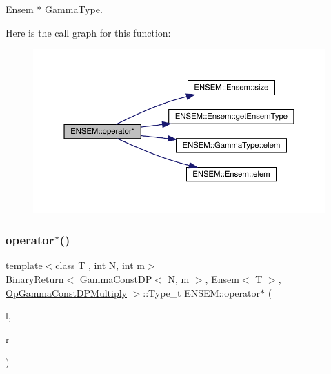 \mbox{\hyperlink{classENSEM_1_1Ensem}{Ensem}} $\ast$ \mbox{\hyperlink{classENSEM_1_1GammaType}{Gamma\+Type}}. 

Here is the call graph for this function\+:\nopagebreak
\begin{figure}[H]
\begin{center}
\leavevmode
\includegraphics[width=350pt]{d1/d9e/group__eensem_ga5a4ddba3b396c11e474246b57940a2cc_cgraph}
\end{center}
\end{figure}
\mbox{\label{group__eensem_ga60f93a7eee86e9559faa6e162cf9b9a1}} 
\subsubsection{\texorpdfstring{operator$\ast$()}{operator*()}\hspace{0.1cm}{\footnotesize\ttfamily [8/11]}}
{\footnotesize\ttfamily template$<$class T , int N, int m$>$ \\
\mbox{\hyperlink{structENSEM_1_1BinaryReturn}{Binary\+Return}}$<$ \mbox{\hyperlink{classENSEM_1_1GammaConstDP}{Gamma\+Const\+DP}}$<$ \mbox{\hyperlink{adat__devel_2lib_2hadron_2operator__name__util_8cc_a7722c8ecbb62d99aee7ce68b1752f337}{N}}, m $>$, \mbox{\hyperlink{classENSEM_1_1Ensem}{Ensem}}$<$ T $>$, \mbox{\hyperlink{structENSEM_1_1OpGammaConstDPMultiply}{Op\+Gamma\+Const\+D\+P\+Multiply}} $>$\+::Type\+\_\+t E\+N\+S\+E\+M\+::operator$\ast$ (\begin{DoxyParamCaption}\item[{const \mbox{\hyperlink{classENSEM_1_1GammaConstDP}{Gamma\+Const\+DP}}$<$ \mbox{\hyperlink{adat__devel_2lib_2hadron_2operator__name__util_8cc_a7722c8ecbb62d99aee7ce68b1752f337}{N}}, m $>$ \&}]{l,  }\item[{const \mbox{\hyperlink{classENSEM_1_1Ensem}{Ensem}}$<$ T $>$ \&}]{r }\end{DoxyParamCaption})\hspace{0.3cm}{\ttfamily [inline]}}



